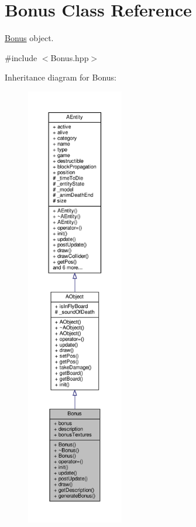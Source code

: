 \hypertarget{class_bonus}{}\section{Bonus Class Reference}
\label{class_bonus}


\hyperlink{class_bonus}{Bonus} object.  




{\ttfamily \#include $<$Bonus.\+hpp$>$}



Inheritance diagram for Bonus\+:
\nopagebreak
\begin{figure}[H]
\begin{center}
\leavevmode
\includegraphics[height=550pt]{class_bonus__inherit__graph}
\end{center}
\end{figure}


